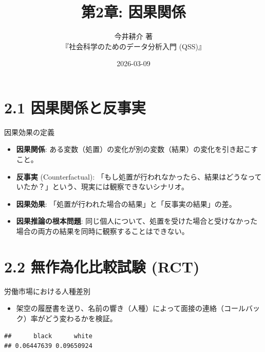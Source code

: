 \documentclass[
  ignorenonframetext,
]{beamer}
\title{第2章: 因果関係}
\subtitle{今井耕介 著\\
『社会科学のためのデータ分析入門 (QSS)』}
\author{}
\date{\vspace{-2.5em}2026-03-09}
\newenvironment{Shaded}{\begin{snugshade}}{\end{snugshade}}
\newcommand{\CommentTok}[1]{\textcolor[rgb]{0.56,0.35,0.01}{\textit{#1}}}
\newcommand{\FunctionTok}[1]{\textcolor[rgb]{0.00,0.00,0.00}{#1}}
\newcommand{\NormalTok}[1]{#1}
\newcommand{\OtherTok}[1]{\textcolor[rgb]{0.56,0.35,0.01}{#1}}
\newcommand{\SpecialCharTok}[1]{\textcolor[rgb]{0.00,0.00,0.00}{#1}}
\newcommand{\StringTok}[1]{\textcolor[rgb]{0.31,0.60,0.02}{#1}}
\providecommand{\tightlist}{%
  \setlength{\itemsep}{0pt}\setlength{\parskip}{0pt}}
\begin{document}
\frame{\titlepage}

\hypertarget{ux56e0ux679cux95a2ux4fc2ux3068ux53cdux4e8bux5b9f}{%
\section{2.1
因果関係と反事実}\label{ux56e0ux679cux95a2ux4fc2ux3068ux53cdux4e8bux5b9f}}

\begin{frame}{因果効果の定義}
\protect\hypertarget{ux56e0ux679cux52b9ux679cux306eux5b9aux7fa9}{}
\begin{itemize}
\tightlist
\item
  \textbf{因果関係}:
  ある変数（処置）の変化が別の変数（結果）の変化を引き起こすこと。
\item
  \textbf{反事実} (Counterfactual):
  「もし処置が行われなかったら、結果はどうなっていたか？」という、現実には観察できないシナリオ。
\item
  \textbf{因果効果}:
  「処置が行われた場合の結果」と「反事実の結果」の差。
\item
  \textbf{因果推論の根本問題}:
  同じ個人について、処置を受けた場合と受けなかった場合の両方の結果を同時に観察することはできない。
\end{itemize}
\end{frame}

\hypertarget{ux7121ux4f5cux70baux5316ux6bd4ux8f03ux8a66ux9a13-rct}{%
\section{2.2 無作為化比較試験
(RCT)}\label{ux7121ux4f5cux70baux5316ux6bd4ux8f03ux8a66ux9a13-rct}}

\begin{frame}[fragile]{労働市場における人種差別}
\protect\hypertarget{ux52b4ux50cdux5e02ux5834ux306bux304aux3051ux308bux4ebaux7a2eux5deeux5225}{}
\begin{itemize}
\tightlist
\item
  架空の履歴書を送り、名前の響き（人種）によって面接の連絡（コールバック）率がどう変わるかを検証。
\end{itemize}

\begin{Shaded}
\end{Shaded}

\begin{verbatim}
##      black      white 
## 0.06447639 0.09650924
\end{verbatim}
\end{frame}
\end{document}
